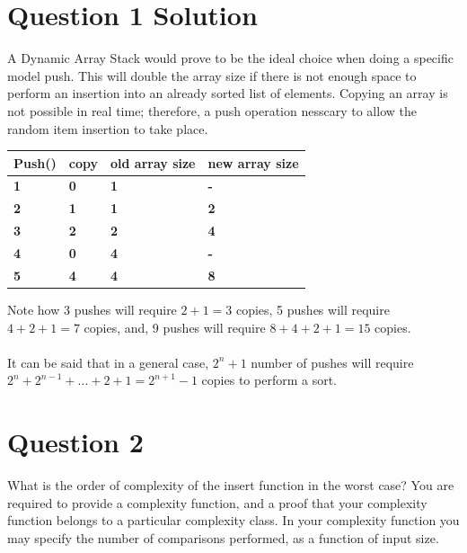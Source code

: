 \documentclass[11pt]{article}
\begin{document}
\section{Question 1 Solution}

A Dynamic Array Stack would prove to be the ideal choice when doing a specific model push. This will double the array size if there is not enough space to perform an insertion into an already sorted list of elements. Copying an array is not possible in real time; therefore, a push operation nesscary to allow the random item insertion to take place.

\begin{table}[h]
\centering
\begin{tabular}{|l|l|l|l|}
\hline
\textbf{Push()} & \textbf{copy} & \textbf{old array size} & 
\textbf{new array size} \\
\hline
\textbf{1} & \textbf{0} & \textbf{1} & \textbf{-} \\
\hline
\textbf{2} & \textbf{1} & \textbf{1} & \textbf{2} \\
\hline
\textbf{3} & \textbf{2} & \textbf{2} & \textbf{4} \\
\hline
\textbf{4} & \textbf{0} & \textbf{4} & \textbf{-} \\
\hline
\textbf{5} & \textbf{4} & \textbf{4} & \textbf{8} \\
\hline
\end{tabular}
\end{table}

Note how 3 pushes will require $2 + 1 = 3$ copies, 5 pushes will require $4 + 2 + 1 = 7$ copies, and, 9 pushes will require $8 + 4 + 2 + 1 = 15$ copies. \\
\\
It can be said that in a general case, $2^{n}+1$ number of pushes will require $2^n+ 2^{n-1} + ... + 2 + 1 = 2^{n+1} - 1$ copies to perform a sort.\\ 

\section{Question 2}

What is the order of complexity of the insert function in the worst case? You are required to provide a complexity function, and a proof that your complexity function belongs to a particular complexity class. In your complexity function you may specify the number of comparisons performed, as a function of input size.
\end{document}
